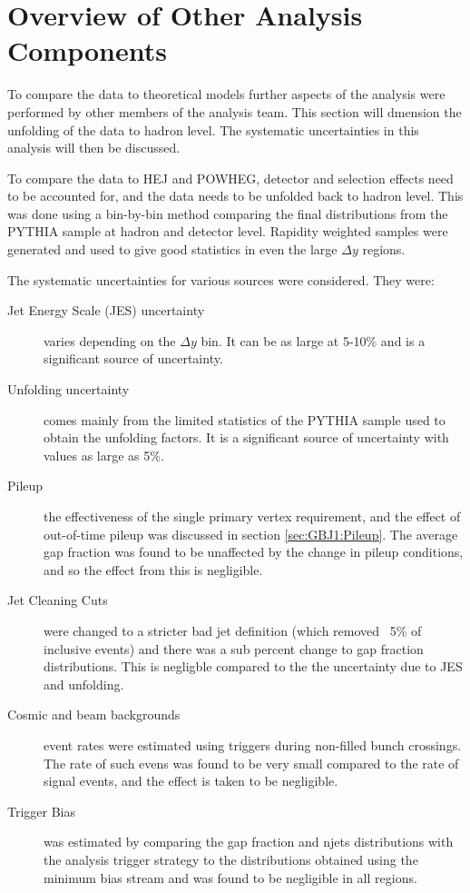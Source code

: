 \section{Overview of Other Analysis Components}
\label{sec:GBJ1:OtherWork}
To compare the data to theoretical models further aspects of the analysis were performed by other members of the analysis team. This section will dmension the unfolding of the data to hadron level. The systematic uncertainties in this analysis will then be discussed.

To compare the data to HEJ and POWHEG, detector and selection effects need to be accounted for, and the data needs to be unfolded back to hadron level. This was done using a bin-by-bin method comparing the final distributions from the PYTHIA sample at hadron and detector level. Rapidity weighted samples were generated and used to give good statistics in even the large $\Delta y$ regions.


The systematic uncertainties for various sources were considered. They were:
\begin{description}
\item[Jet Energy Scale (JES) uncertainty] varies depending on the $\Delta y$ bin. It can be as large at 5-10\% and is a significant source of uncertainty.

\item[Unfolding uncertainty] comes mainly from the limited statistics of the PYTHIA sample used to obtain the unfolding factors. It is a significant source of uncertainty with values as large as 5\%.

\item[Pileup] the effectiveness of the single primary vertex requirement, and the effect of out-of-time pileup was discussed in section \ref{sec:GBJ1:Pileup}. The average gap fraction was found to be unaffected by the change in pileup conditions, and so the effect from this is negligible.  

\item[Jet Cleaning Cuts] were changed to a stricter bad jet definition (which removed ~5\% of inclusive events) and there was a sub percent change to gap fraction distributions. This is negligble compared to the the uncertainty due to JES and unfolding.  

\item[Cosmic and beam backgrounds] event rates were estimated using triggers during non-filled bunch crossings. The rate of such evens was found to be very small compared to the rate of signal events, and the effect is taken to be negligible.

\item[Trigger Bias] was estimated by comparing the gap fraction and njets distributions with the analysis trigger strategy to the distributions obtained using the minimum bias stream and was found to be negligible in all regions.

\end{description}

